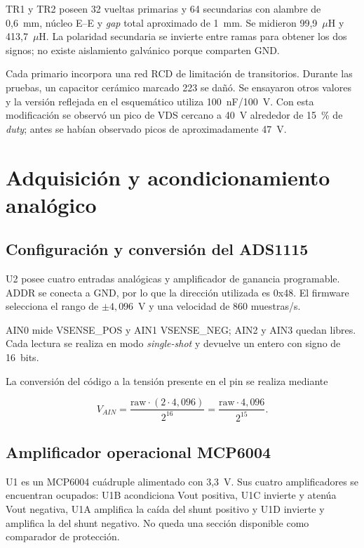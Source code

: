 \documentclass[conference]{IEEEtran}
\begin{document}
TR1 y TR2 poseen 32 vueltas primarias y 64 secundarias con alambre de 0,6~mm, núcleo E--E y \textit{gap} total aproximado de 1~mm. Se midieron 99,9~$\mu$H y 413,7~$\mu$H. La polaridad secundaria se invierte entre ramas para obtener los dos signos; no existe aislamiento galvánico porque comparten GND.

Cada primario incorpora una red RCD de limitación de transitorios. Durante las pruebas, un capacitor cerámico marcado 223 se dañó. Se ensayaron otros valores y la versión reflejada en el esquemático utiliza 100~nF/100~V. Con esta modificación se observó un pico de VDS cercano a 40~V alrededor de 15~\% de \textit{duty}; antes se habían observado picos de aproximadamente 47~V.

\section{Adquisición y acondicionamiento analógico}

\subsection{Configuración y conversión del ADS1115}

U2 posee cuatro entradas analógicas y amplificador de ganancia programable. ADDR se conecta a GND, por lo que la dirección utilizada es 0x48. El firmware selecciona el rango de $\pm4,096$~V y una velocidad de 860 muestras/s.

AIN0 mide VSENSE\_POS y AIN1 VSENSE\_NEG; AIN2 y AIN3 quedan libres. Cada lectura se realiza en modo \textit{single-shot} y devuelve un entero con signo de 16~bits.

La conversión del código a la tensión presente en el pin se realiza mediante

\begin{equation}
V_{AIN}=\frac{\text{raw}\cdot(2\cdot4,096)}{2^{16}}
=\frac{\text{raw}\cdot4,096}{2^{15}}.
\end{equation}

\subsection{Amplificador operacional MCP6004}

U1 es un MCP6004 cuádruple alimentado con 3,3~V. Sus cuatro amplificadores se encuentran ocupados: U1B acondiciona Vout positiva, U1C invierte y atenúa Vout negativa, U1A amplifica la caída del shunt positivo y U1D invierte y amplifica la del shunt negativo. No queda una sección disponible como comparador de protección.
\end{document}

